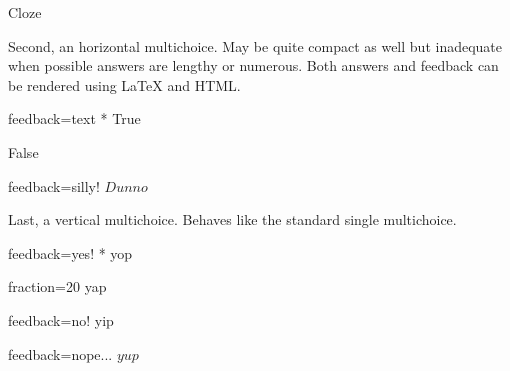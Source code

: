 \documentclass[twocolumn]{article}
\begin{document}
\begin{quiz}
\begin{cloze}{Cloze}
\begin{multi}[horizontal]
Second, an horizontal multichoice. May be quite compact as well but inadequate 
when possible answers are lengthy or numerous. Both answers and feedback can 
be rendered using LaTeX and HTML.
\item[feedback={text}]* True
\item[] False
\item[feedback={silly!}] $Dunno$
\end{multi}

\begin{multi}[vertical]
Last, a vertical multichoice. Behaves like the standard single multichoice.
\item[feedback={yes!}]* yop
\item[fraction=20] yap
\item[feedback={no!}] yip
\item[feedback={nope...}] $yup$
\end{multi}
\end{cloze}

\end{quiz}

\end{document}
